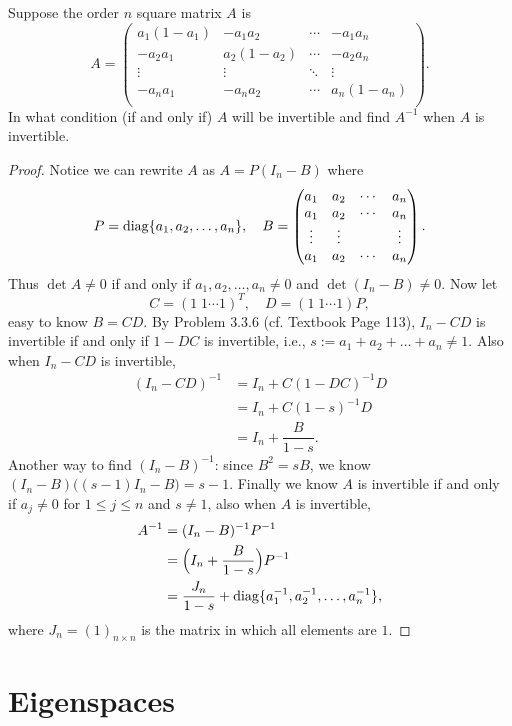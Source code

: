 \begin{pro}%
	Suppose the order $n$ square matrix $A$ is 
	\[A=\begin{pmatrix}
	a_1(1-a_1) & -a_1a_2 & \cdots & -a_1a_n\\
	-a_2a_1 & a_2(1-a_2) & \cdots & -a_2a_n\\
	\vdots  & \vdots     & \ddots & \vdots \\
	-a_na_1 & -a_na_2    & \cdots & a_n(1-a_n)\\\end{pmatrix}.\]
	In what condition (if and only if) $A$ will be invertible and find $A^{-1}$ when $A$ is invertible.
\end{pro}
\begin{proof}
	Notice we can rewrite $A$ as $A=P(I_n-B)$ where
	\[P=\operatorname*{diag}\{a_1,a_2,\dots,a_n\},\quad B=
	\begin{pmatrix}
	a_1 & a_2 & \cdots & a_n\\
	a_1 & a_2 & \cdots & a_n\\
	\vdots & \vdots & & \vdots\\
	a_1 & a_2 & \cdots & a_n\end{pmatrix}.\]
	Thus $\det A\neq 0$ if and only if $a_1,a_2,\dots,a_n\neq 0$ and $\det (I_n-B)\neq 0$. Now let 
	\[C=(1\; 1\cdots 1)^T,\quad D=(1\;1 \cdots 1)P,\]
	easy to know $B=CD$. By Problem $3.3.6$ (cf. Textbook Page 113), $I_n-CD$ is invertible if and only if $1-DC$ is invertible, i.e., $s:=a_1+a_2+\dots+a_n\neq 1$. Also when $I_n-CD$ is invertible, 
	\begin{align*}
	(I_n-CD)^{-1}&=I_n+C(1-DC)^{-1}D\\
				 &=I_n+C(1-s)^{-1}D\\
				 &=I_n+\dfrac{B}{1-s}.
	\end{align*}
	Another way to find $(I_n-B)^{-1}$: since $B^2=sB$, we know $(I_n-B)\big((s-1)I_n-B\big)=s-1$. Finally we know $A$ is invertible if and only if $a_j\neq 0$ for $1\leq j\leq n$ and $s\neq 1$, also when $A$ is invertible, 
	\begin{align*}
	A^{-1}&=(I_n-B)^{-1}P^{-1}\\
		  &=\Big(I_n+\frac{B}{1-s}\Big)P^{-1}\\
		  &=\frac{J_n}{1-s}+\operatorname*{diag}\{a_1^{-1},a_2^{-1},\dots,a_n^{-1}\},	 	
	\end{align*}
	where $J_n=(1)_{n\times n}$ is the matrix in which all elements are $1$.
\end{proof}
\section{Eigenspaces}

